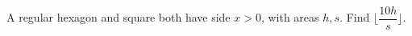 A regular hexagon and square both have side $x>0$, with areas $h,s$. Find $\lfloor\dfrac{10h}{s}\rfloor$.
